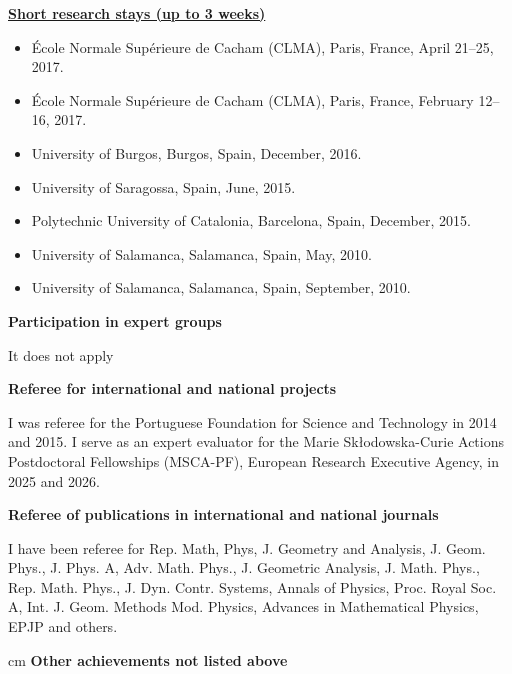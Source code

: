 \documentclass[12pt,reqno]{amsbook}
\begin{document}
  \centerline{\bf \underline{Short research stays (up to 3 weeks)}}
\vskip 0.5cm
\begin{itemize}
        \item \'Ecole Normale Sup\'erieure de Cacham (CLMA), Paris, France, April 21--25, 2017.
    \item \'Ecole Normale Sup\'erieure de Cacham (CLMA), Paris, France, February 12--16, 2017.
    \item University of Burgos, Burgos, Spain, December, 2016.
    \item University of Saragossa, Spain, June, 2015.
    \item Polytechnic University of Catalonia, Barcelona, Spain, December, 2015.
    \item University of Salamanca, Salamanca, Spain, May, 2010.
    \item University of Salamanca, Salamanca, Spain, September, 2010.
  \end{itemize}
 
\vskip 0.5cm

{\bf Participation in expert  groups}
\vskip 0.5cm

It does not apply

\vskip 0.5cm

{\bf Referee for international and national projects}

\vskip 0.5cm

I was referee for the Portuguese Foundation for Science and Technology in 2014 and 2015.
I serve as an expert evaluator for the Marie Sk\l odowska-Curie Actions Postdoctoral Fellowships (MSCA-PF), European Research Executive Agency, in 2025 and 2026.
\vskip 0.5cm

{\bf Referee of publications in international and national journals}

\vskip 0.5cm
I have been referee for  Rep. Math, Phys, J. Geometry and Analysis, J. Geom. Phys., J. Phys. A, Adv. Math. Phys., J. Geometric Analysis, J. Math. Phys., Rep. Math. Phys., J. Dyn. Contr. Systems, Annals of Physics, Proc. Royal Soc. A, Int. J. Geom. Methods Mod. Physics, Advances in Mathematical Physics,  EPJP and others.  

 cm
{\bf  Other achievements not listed above}
\end{document}
